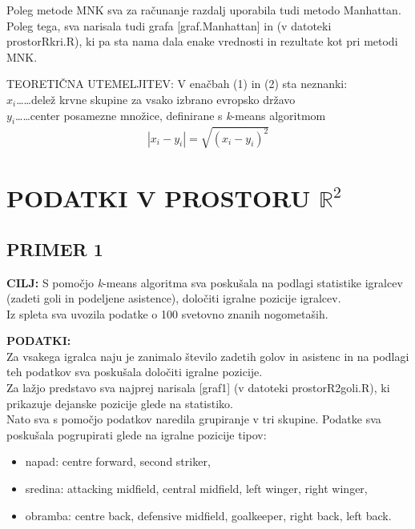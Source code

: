 \documentclass[11pt, a4paper]{article}
\begin{document}
\vspace{0.5 cm}

\noindent Poleg metode MNK sva za računanje razdalj uporabila tudi metodo Manhattan. Poleg tega, sva narisala tudi grafa [graf.Manhattan] in  (v datoteki prostorRkri.R), ki pa sta nama dala enake vrednosti in rezultate kot pri metodi MNK.

\vspace{0.5 cm}

\noindent TEORETIČNA UTEMELJITEV: V enačbah (1) in (2) sta neznanki:\\ 
$x_i$\ldots\ldots delež krvne skupine za vsako izbrano evropsko državo \\
$y_i$\ldots\ldots center posamezne množice, definirane s \textsl{k}-means algoritmom  \\
\begin{align*}
| x_i - y_i | = \sqrt{(x_i - y_i)^2}
\end{align*}

\newpage

\section{PODATKI V PROSTORU $\mathbb{R}^2$}
\subsection{PRIMER 1}
\noindent \textbf{CILJ:} S pomočjo \textsl{k}-means algoritma sva poskušala na podlagi statistike igralcev (zadeti goli in podeljene asistence), določiti igralne pozicije igralcev. \\

\noindent Iz spleta sva uvozila podatke o 100 svetovno znanih nogometaših.

\vspace{0.5 cm}

\noindent \textbf{PODATKI:} \\
\noindent Za vsakega igralca naju je zanimalo število zadetih golov in asistenc in na podlagi teh podatkov sva poskušala določiti igralne pozicije. \\

\noindent Za lažjo predstavo sva najprej narisala [graf1] (v datoteki prostorR2goli.R), ki prikazuje dejanske pozicije glede na statistiko. \\
\noindent Nato sva s pomočjo podatkov naredila grupiranje v tri skupine. Podatke sva poskušala pogrupirati glede na igralne pozicije tipov: 
\begin{itemize}
	\item napad: centre forward, second striker,
	\item sredina: attacking midfield, central midfield, left winger, right winger,
	\item obramba: centre back, defensive midfield, goalkeeper, right back, left back.
\end{itemize}
\end{document}
